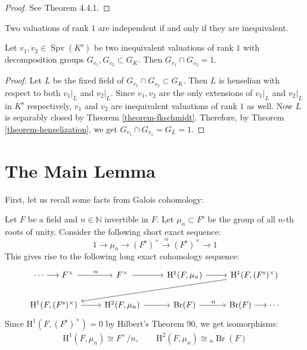\begin{proof}
See \cite{EP05} Theorem 4.4.1.
\end{proof}

\begin{remark}
Two valuations of rank $1$ are independent if and only if they are inequivalent.
\end{remark}

\begin{corollary}\label{corollary-fkschmidt}
Let $v_1,v_2\in\operatorname{Spv}(K^\text{s})$ be two inequivalent valuations of rank $1$ with decomposition groups $G_{{v_1}},G_{{v_2}}\subset G_K$. Then $G_{{v_1}}\cap G_{{v_2}}=1$.
\end{corollary}

\begin{proof}
Let $L$ be the fixed field of $G_{v_1}\cap G_{v_2}\subset G_K$. Then $L$ is henselian with respect to both $v_1|_L$ and $v_2|_L$. Since $v_1,v_2$ are the only extensions of $v_1|_L$ and $v_2|_L$ in $K^\text{s}$ respectively, $v_1$ and $v_2$ are inequivalent valuations of rank $1$ as well. Now $L$ is separably closed by Theorem \ref{theorem-fkschmidt}. Therefore, by Theorem \ref{theorem-henselization}, we get $G_{{v_1}}\cap G_{{v_1}}=G_L =1$.
\end{proof}

\section{The Main Lemma}

First, let us recall some facts from Galois cohomology:

\begin{proposition}\label{prop:kummer-theory}
Let $F$ be a field and $n\in\mathbb{N}$ invertible in $F$. Let $\mu_n\subset F^\text{s}$ be the group of all $n$-th roots of unity. Consider the following short exact sequence:
\[ 1\longrightarrow \mu_n\longrightarrow (F^\text{s})^\times \stackrel{\cdot n}{\longrightarrow} (F^\text{s})^\times \longrightarrow 1 \]
This gives rise to the following long exact cohomology sequence:
\[\begin{tikzcd}
\cdots\longrightarrow F^\times \ar[r, "\cdot n"]& F^\times \ar[r]& \mathrm{H}^1(F, \mu_n)\ar[r] & \mathrm{H}^1(F, (F^\text{s})^\times)\ar[dlll]\\
\mathrm{H}^1(F, (F^\text{s})^\times)\ar[r] & \mathrm{H}^2(F, \mu_n)\ar[r] & \operatorname{Br}(F)\ar[r, "\cdot n"] & \operatorname{Br}(F) \longrightarrow \cdots
\end{tikzcd}\]
Since $\mathrm{H}^1(F, (F^\text{s})^\times)=0$ by Hilbert's Theorem 90, we get isomorphisms:
\begin{align*}
\mathrm{H}^1(F,\mu_n) \cong F^\times/n, \qquad \mathrm{H}^2(F, \mu_n) \cong {}_n\operatorname{Br}(F)
\end{align*}
\end{proposition}

